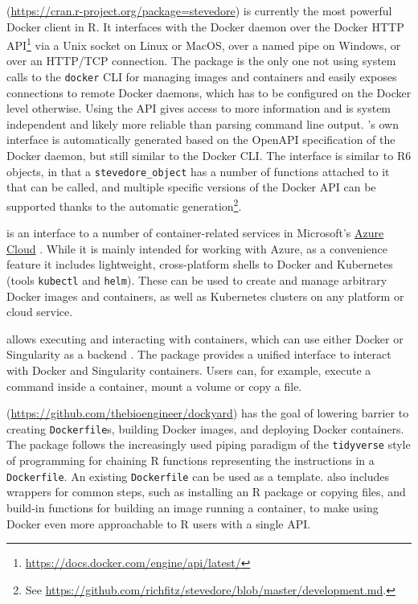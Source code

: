 \textbf{}
(\url{https://cran.r-project.org/package=stevedore}) is currently the
most powerful Docker client in R. It interfaces with the Docker daemon
over the Docker HTTP
API\footnote{\href{https://docs.docker.com/engine/api/latest/}{https://docs.docker.com/engine/api/latest/}}
via a Unix socket on Linux or MacOS, over a named pipe on Windows, or
over an HTTP/TCP connection. The package is the only one not using
system calls to the \texttt{docker} CLI for managing images and
containers and easily exposes connections to remote Docker daemons,
which has to be configured on the Docker level otherwise. Using the API
gives access to more information and is system independent and likely
more reliable than parsing command line output. 's
own interface is automatically generated based on the OpenAPI
specification of the Docker daemon, but still similar to the Docker CLI.
The interface is similar to R6 objects, in that a
\texttt{stevedore\_object} has a number of functions attached to it that
can be called, and multiple specific versions of the Docker API can be
supported thanks to the automatic
generation\footnote{See \href{https://github.com/richfitz/stevedore/blob/master/development.md}{https://github.com/richfitz/stevedore/blob/master/development.md}.}.

\textbf{} is an interface to a number of
container-related services in Microsoft's
\href{https://azure.microsoft.com/}{Azure Cloud}
\citep{AzureContainers_2019}. While it is mainly intended for working
with Azure, as a convenience feature it includes lightweight,
cross-platform shells to Docker and Kubernetes (tools \texttt{kubectl}
and \texttt{helm}). These can be used to create and manage arbitrary
Docker images and containers, as well as Kubernetes clusters on any
platform or cloud service.

\textbf{} allows executing and interacting with
containers, which can use either Docker or Singularity as a backend
\citep{cannoodt_babelwhale_2019}. The package provides a unified
interface to interact with Docker and Singularity containers. Users can,
for example, execute a command inside a container, mount a volume or
copy a file.

\textbf{}
(\url{https://github.com/thebioengineer/dockyard}) has the goal of
lowering barrier to creating \texttt{Dockerfile}s, building Docker
images, and deploying Docker containers. The package follows the
increasingly used piping paradigm of the \texttt{tidyverse} style of
programming for chaining R functions representing the instructions in a
\texttt{Dockerfile}. An existing \texttt{Dockerfile} can be used as a
template.  also includes wrappers for common steps, such
as installing an R package or copying files, and build-in functions for
building an image running a container, to make using Docker even more
approachable to R users with a single API.

